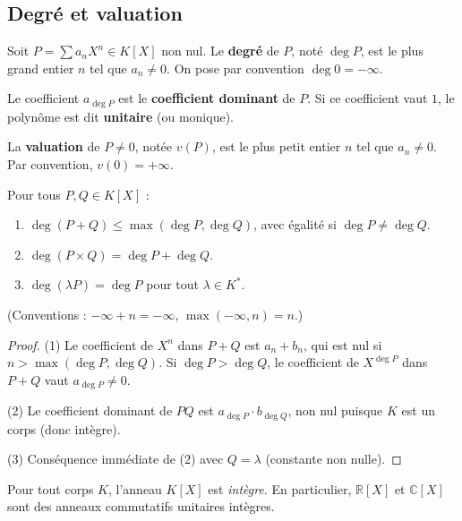 \subsection{Degré et valuation}

\begin{definition}[Degré]
Soit $P = \sum a_n X^n \in K[X]$ non nul. Le \textbf{degré} de $P$, noté $\deg P$, est le plus grand entier $n$ tel que $a_n \neq 0$. On pose par convention $\deg 0 = -\infty$.

Le coefficient $a_{\deg P}$ est le \textbf{coefficient dominant} de $P$. Si ce coefficient vaut $1$, le polynôme est dit \textbf{unitaire} (ou monique).
\end{definition}

\begin{definition}[Valuation]
La \textbf{valuation} de $P \neq 0$, notée $v(P)$, est le plus petit entier $n$ tel que $a_n \neq 0$. Par convention, $v(0) = +\infty$.
\end{definition}

\begin{proposition}
Pour tous $P, Q \in K[X]$ :
\begin{enumerate}
    \item $\deg(P + Q) \le \max(\deg P, \deg Q)$, avec égalité si $\deg P \neq \deg Q$.
    \item $\deg(P \times Q) = \deg P + \deg Q$.
    \item $\deg(\lambda P) = \deg P$ pour tout $\lambda \in K^*$.
\end{enumerate}
(Conventions : $-\infty + n = -\infty$, $\max(-\infty, n) = n$.)
\end{proposition}

\begin{proof}
(1) Le coefficient de $X^n$ dans $P + Q$ est $a_n + b_n$, qui est nul si $n > \max(\deg P, \deg Q)$. Si $\deg P > \deg Q$, le coefficient de $X^{\deg P}$ dans $P + Q$ vaut $a_{\deg P} \neq 0$.

(2) Le coefficient dominant de $PQ$ est $a_{\deg P} \cdot b_{\deg Q}$, non nul puisque $K$ est un corps (donc intègre).

(3) Conséquence immédiate de (2) avec $Q = \lambda$ (constante non nulle).
\end{proof}

\begin{corollaire}[{Intégrité de $K[X]$}]
Pour tout corps $K$, l'anneau $K[X]$ est \emph{intègre}. En particulier, $\mathbb{R}[X]$ et $\mathbb{C}[X]$ sont des anneaux commutatifs unitaires intègres.
\end{corollaire}


